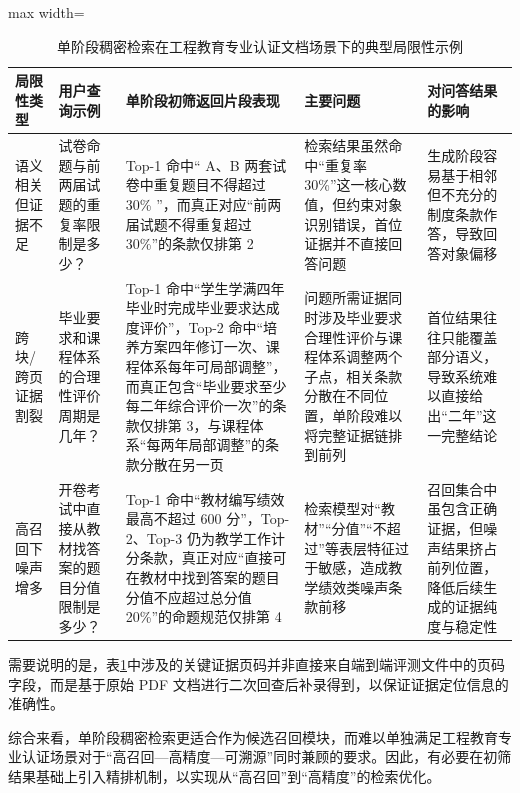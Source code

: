 \documentclass[UTF8,a4paper,zihao=-4]{ctexart}
\begin{document}
\begin{table}[H]
\centering
\caption{单阶段稠密检索在工程教育专业认证文档场景下的典型局限性示例}
\label{tab:dense_limit_cases}
{\small
\renewcommand{\arraystretch}{1.2}
\begin{adjustbox}{max width=\textwidth}
\begin{tabular}{p{2.3cm} p{3.8cm} p{4.6cm} p{3.6cm} p{3.8cm}}
\toprule
局限性类型 & 用户查询示例 & 单阶段初筛返回片段表现 & 主要问题 & 对问答结果的影响 \\
\midrule
语义相关但证据不足
& 试卷命题与前两届试题的重复率限制是多少？
& Top-1 命中“ A、B 两套试卷中重复题目不得超过 30\% ”，而真正对应“前两届试题不得重复超过 30\%”的条款仅排第 2
& 检索结果虽然命中“重复率 30\%”这一核心数值，但约束对象识别错误，首位证据并不直接回答问题
& 生成阶段容易基于相邻但不充分的制度条款作答，导致回答对象偏移 \\

跨块/跨页证据割裂
& 毕业要求和课程体系的合理性评价周期是几年？
& Top-1 命中“学生学满四年毕业时完成毕业要求达成度评价”，Top-2 命中“培养方案四年修订一次、课程体系每年可局部调整”，而真正包含“毕业要求至少每二年综合评价一次”的条款仅排第 3，与课程体系“每两年局部调整”的条款分散在另一页
& 问题所需证据同时涉及毕业要求合理性评价与课程体系调整两个子点，相关条款分散在不同位置，单阶段难以将完整证据链排到前列
& 首位结果往往只能覆盖部分语义，导致系统难以直接给出“二年”这一完整结论 \\

高召回下噪声增多
& 开卷考试中直接从教材找答案的题目分值限制是多少？
& Top-1 命中“教材编写绩效最高不超过 600 分”，Top-2、Top-3 仍为教学工作计分条款，真正对应“直接可在教材中找到答案的题目分值不应超过总分值 20\%”的命题规范仅排第 4
& 检索模型对“教材”“分值”“不超过”等表层特征过于敏感，造成教学绩效类噪声条款前移
& 召回集合中虽包含正确证据，但噪声结果挤占前列位置，降低后续生成的证据纯度与稳定性 \\
\bottomrule
\end{tabular}
\end{adjustbox}
}
\end{table}

需要说明的是，表\ref{tab:dense_limit_cases}中涉及的关键证据页码并非直接来自端到端评测文件中的页码字段，而是基于原始 PDF 文档进行二次回查后补录得到，以保证证据定位信息的准确性。

综合来看，单阶段稠密检索更适合作为候选召回模块，而难以单独满足工程教育专业认证场景对于“高召回—高精度—可溯源”同时兼顾的要求。因此，有必要在初筛结果基础上引入精排机制，以实现从“高召回”到“高精度”的检索优化。
\end{document}
